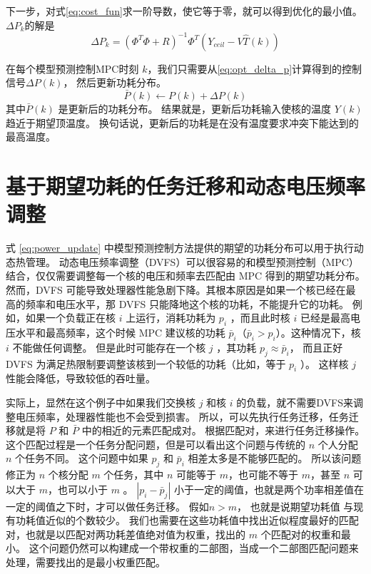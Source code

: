 下一步，对式\eqref{eq:cost_fun}求一阶导数，使它等于零，就可以得到优化的最小值。
$\Delta P_k$的解是
\begin{equation}\label{eq:opt_delta_p}
\Delta P_k = (\Phi^T \Phi + R)^{-1}\Phi^T(Y_{ceil}-V\hat{T}(k))
\end{equation}

在每个模型预测控制MPC时刻 $k$，我们只需要从\eqref{eq:opt_delta_p}计算得到的控制信号$\Delta P(k)$， 
然后更新功耗分布。
\begin{equation}\label{eq:power_update}
\bar{P}(k) \gets P(k) + \Delta P(k)
\end{equation}
其中$\bar{P}(k)$  是更新后的功耗分布。
结果就是，更新后功耗输入使核的温度 $Y(k)$ 趋近于期望顶温度。
换句话说，更新后的功耗是在没有温度要求冲突下能达到的最高温度。

\section{基于期望功耗的任务迁移和动态电压频率调整}\label{sec:dtm_mpc}

式 \eqref{eq:power_update} 中模型预测控制方法提供的期望的功耗分布可以用于执行动态热管理。
动态电压频率调整（DVFS）可以很容易的和模型预测控制（MPC）结合，仅仅需要调整每一个核的电压和频率去匹配由 MPC 得到的期望功耗分布。
然而，DVFS 可能导致处理器性能急剧下降。其根本原因是如果一个核已经在最高的频率和电压水平，那 DVFS 只能降地这个核的功耗，不能提升它的功耗。
例如，如果一个负载正在核 $i$ 上运行，消耗功耗为 $p_i$ ，而且此时核 $i$ 已经是最高电压水平和最高频率，这个时候 MPC 建议核的功耗 $\bar{p}_i$（$\bar{p}_i>p_i$）。这种情况下，核 $i$ 不能做任何调整。
但是此时可能存在一个核 $j$ ，其功耗 $p_j \approx \bar{p}_i$， 而且正好 DVFS 为满足热限制要调整该核到一个较低的功耗（比如，等于 $p_i$ ）。
这样核 $j$ 性能会降低，导致较低的吞吐量。

实际上，显然在这个例子中如果我们交换核 $j$ 和核 $i$ 的负载，就不需要DVFS来调整电压频率，处理器性能也不会受到损害。
所以，可以先执行任务迁移，任务迁移就是将 $P$ 和 $\bar{P}$ 中的相近的元素匹配成对。
根据匹配对，来进行任务迁移操作。
这个匹配过程是一个任务分配问题，但是可以看出这个问题与传统的 $n$  个人分配 $n$ 个任务不同。
这个问题中如果 $p_j$ 和 $\bar{p}_i$ 相差太多是不能够匹配的。
所以该问题修正为 $n$  个核分配 $m$ 个任务，其中 $n$ 可能等于 $m$，也可能不等于 $m$，甚至 $n$ 可以大于 $m$，也可以小于 $m$ 。
$|p_i-\bar{p}_j|$ 小于一定的阈值，也就是两个功率相差值在一定的阈值之下时，才可以做任务迁移。
假如$ n > m$， 也就是说期望功耗值 与现有功耗值近似的个数较少。
我们也需要在这些功耗值中找出近似程度最好的匹配对，也就是以匹配对两功耗差值绝对值为权重，找出的 $m$ 个匹配对的权重和最小。
这个问题仍然可以构建成一个带权重的二部图，当成一个二部图匹配问题来处理，需要找出的是最小权重匹配。

